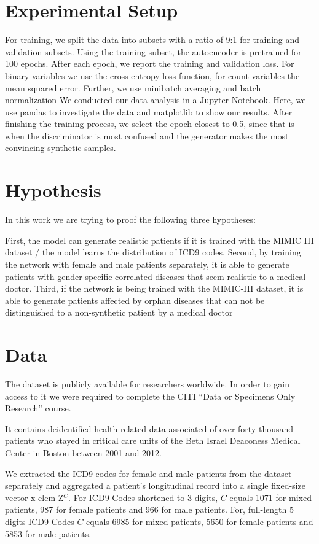 \documentclass[11pt, a4paper]{book}
\begin{document}
\section{Experimental Setup}
 For training, we split the data into subsets with a ratio of 9:1 for training and validation subsets. Using the training subset, the autoencoder is pretrained for 100 epochs. 
 After each epoch, we report the training and validation loss. For binary variables we use the cross-entropy loss  function, for count variables the mean squared error.
 Further, we use minibatch averaging and batch normalization
We conducted our data analysis in a Jupyter Notebook. Here, we use pandas to investigate the data and matplotlib to show our results.
After finishing the training process, we select the epoch closest to 0.5, since that is when the discriminator is most confused and the generator makes the most convincing synthetic samples.


\section{Hypothesis}
In this work we are trying to proof the following three hypotheses:

First, the model can generate realistic patients if it is trained with the MIMIC III dataset / the model learns the distribution of ICD9 codes.
Second, by training the network with female and male patients separately, it is able to generate patients with gender-specific correlated diseases that seem realistic to a medical doctor.
Third, if the network is being trained with the MIMIC-III dataset, it is able to generate patients affected by orphan diseases that can not be distinguished to a non-synthetic patient by a medical doctor



\section{Data}
The dataset is publicly available for researchers worldwide. In order to gain access to it we were required to complete the CITI “Data or Specimens Only Research” course.

It contains deidentified health-related data associated of over forty thousand patients who stayed in critical care units of the Beth Israel Deaconess Medical Center in Boston between 2001 and 2012.

We extracted the ICD9 codes for female and male patients from the dataset separately and aggregated a patient’s longitudinal record into a single fixed-size vector  x elem Z{$^C$}. For ICD9-Codes shortened to 3 digits, $C$ equals 1071 for mixed patients, 987 for female patients and 966 for male patients. For, full-length 5 digits ICD9-Codes $C$ equals 6985 for mixed patients, 5650 for female patients and 5853 for male patients.
\end{document}
